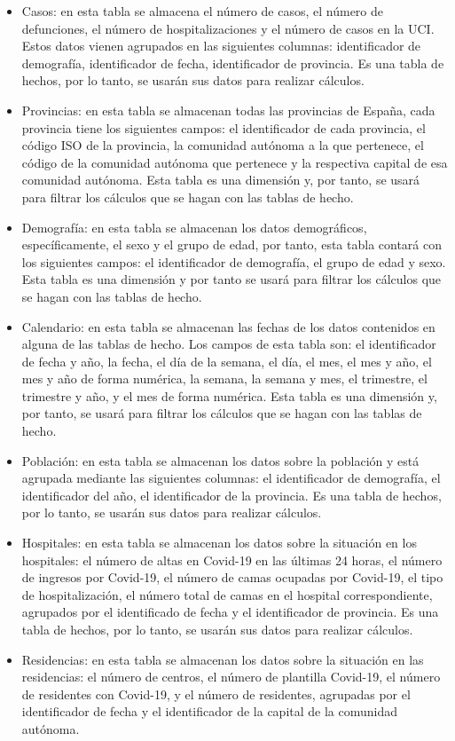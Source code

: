 \begin{itemize}
    \item Casos: en esta tabla se almacena el número de casos, el número de defunciones, el número de hospitalizaciones y el número de casos en la UCI. Estos datos vienen agrupados en las siguientes columnas: identificador de demografía, identificador de fecha, identificador de provincia. Es una tabla de hechos, por lo tanto, se usarán sus datos para realizar cálculos.
    \item Provincias: en esta tabla se almacenan todas las provincias de España, cada provincia tiene los siguientes campos: el identificador de cada provincia, el código ISO de la provincia, la comunidad autónoma a la que pertenece, el código de la comunidad autónoma que pertenece y la respectiva capital de esa comunidad autónoma. Esta tabla es una dimensión y, por tanto, se usará para filtrar los cálculos que se hagan con las tablas de hecho.
    \item Demografía: en esta tabla se almacenan los datos demográficos, específicamente, el sexo y el grupo de edad, por tanto, esta tabla contará con los siguientes campos: el identificador de demografía, el grupo de edad y sexo. Esta tabla es una dimensión y por tanto se usará para filtrar los cálculos que se hagan con las tablas de hecho.
    \item Calendario: en esta tabla se almacenan las fechas de los datos contenidos en alguna de las tablas de hecho. Los campos de esta tabla son: el identificador de fecha y año, la fecha, el día de la semana, el día, el mes, el mes y año, el mes y año de forma numérica, la semana, la semana y mes, el trimestre, el trimestre y año, y el mes de forma numérica. Esta tabla es una dimensión y, por tanto, se usará para filtrar los cálculos que se hagan con las tablas de hecho.
    \item Población: en esta tabla se almacenan los datos sobre la población y está agrupada mediante las siguientes columnas: el identificador de demografía, el identificador del año, el identificador de la provincia. Es una tabla de hechos, por lo tanto, se usarán sus datos para realizar cálculos.
    \item Hospitales: en esta tabla se almacenan los datos sobre la situación en los hospitales: el número de altas en Covid-19 en las últimas 24 horas, el número de ingresos por Covid-19, el número de camas ocupadas por Covid-19, el tipo de hospitalización, el número total de camas en el hospital correspondiente, agrupados por el identificado de fecha y el identificador de provincia. Es una tabla de hechos, por lo tanto, se usarán sus datos para realizar cálculos.
    \item Residencias: en esta tabla se almacenan los datos sobre la situación en las residencias:  el número de centros, el número de plantilla Covid-19, el número de residentes con Covid-19, y el número de residentes, agrupadas por el identificador de fecha y el identificador de la capital de la comunidad autónoma.
\end{itemize}

